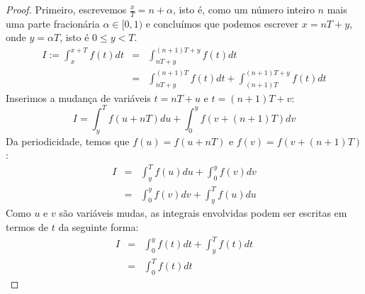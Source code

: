 \begin{proof}
 Primeiro, escrevemos  $\frac{x}{T}=n+\alpha$, isto é, como um número inteiro $n$ mais uma parte fracionária $\alpha\in [0,1)$ e concluímos que podemos escrever $x=nT+y$, onde $y=\alpha T$, isto é $0\leq y <T$.
 \begin{eqnarray*}
  I:=\int_{x}^{x+T} f(t)dt&=& \int_{nT+y}^{(n+1)T+y} f(t)dt\\
  &=&\int_{nT+y}^{(n+1)T} f(t)dt+\int_{(n+1)T}^{(n+1)T+y} f(t)dt
  \end{eqnarray*}
  Inserimos a mudança de variáveis $t=nT+u$ e $t=(n+1)T+v$:
  \begin{equation}I=\int_{y}^{T} f(u+nT)du+\int_{0}^{y} f(v+(n+1)T)dv\end{equation}
   Da periodicidade, temos que $f(u)=f(u+nT)$ e $f(v)=f(v+(n+1)T)$:
   \begin{eqnarray*}
  I&=&\int_{y}^{T} f(u)du+\int_{0}^{y} f(v)dv\\
  &=&\int_{0}^{y} f(v)dv+\int_{y}^{T} f(u)du
  \end{eqnarray*}
  Como $u$ e $v$ são variáveis mudas, as integrais envolvidas podem ser escritas em termos de $t$ da seguinte forma:
   \begin{eqnarray*}
  I&=&\int_{0}^{y} f(t)dt+\int_{y}^{T} f(t)dt\\
  &=&\int_{0}^{T} f(t)dt
  \end{eqnarray*}
\end{proof}
